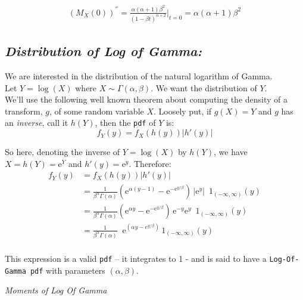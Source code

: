 \documentclass[12pt]{article}
\begin{document}
\begin{align*}
(M_X(0))^{''} =  \frac{\alpha (\alpha + 1) \beta^2} { (1 - \beta t)^{\alpha + 2}}  \Big | _{t=0} = \alpha (\alpha + 1)\beta^2
\end{align*}

\newpage

\begin{center}
\subsection*{\color{TealBlue}\emph{Distribution of Log of Gamma:} }
\end{center}

We are interested in the distribution of the natural logarithm of Gamma. \\
Let $Y = \log (X)$ where  $X\sim\Gamma(\alpha,\beta)$.  We want the distribution of $Y$. \\

We'll use the following well known theorem about computing the density of a transform, $g$, of some random variable $X$. Loosely put, if $g(X) = Y$ and $g$ has an \emph{inverse}, call it $h(Y)$, then the \texttt{pdf} of $Y$ is:
$$
f_Y(y) = f_X(h(y)) |h'(y)|
$$

So here, denoting the inverse of $Y = \log (X)$ by $h(Y)$, we have $ X=h(Y)=\mathrm{e}^Y$ and $h'(y) = \mathrm{e}^{y}$. Therefore:
\begin{align*}
 f_Y(y) &= f_X(h(y)) |h'(y)| \\
 &= \frac{1}{\beta^\alpha \Gamma(\alpha)} \left(\mathrm{e}^{\alpha (y - 1)} - \mathrm{e}^{-\mathrm{e}^{y/\beta}}\right)\,|\mathrm{e}^{y}| \,\,\,1_{(-\infty,\infty)}(y) \\
  &= \frac{1}{\beta^\alpha \Gamma(\alpha)} \left(\mathrm{e}^{\alpha y} - \mathrm{e}^{-\mathrm{e}^{y/\beta}}\right)\,\mathrm{e}^{-y}\mathrm{e}^{y} \,\,\,1_{(-\infty,\infty)}(y) \\
 &= \frac{1}{\beta^\alpha \Gamma(\alpha)} \;\; \mathrm{e}^{\left(\alpha y - e^{y/\beta}\right)}\,1_{(-\infty,\infty)}(y) \\
\end{align*}

This expression  is a valid \texttt{pdf} -- it integrates to 1 - and is said to have a  \texttt{Log-Of-Gamma pdf} with parameters $(\alpha, \beta)$.



\bigskip 
\bigskip 
{\color{TealBlue}\emph{Moments of Log Of Gamma}}\\
\end{document}
